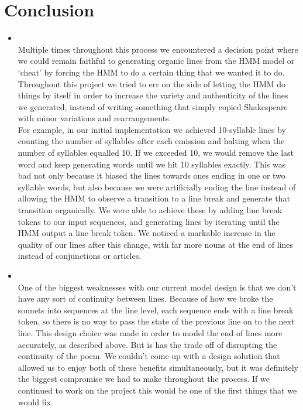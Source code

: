 \section{Conclusion}
\medskip
\begin{itemize}

    \item {} \\

    Multiple times throughout this process we encountered a decision point
    where we could remain faithful to generating organic lines from the HMM
    model or `cheat' by forcing the HMM to do a certain thing that we wanted it
    to do. Throughout this project we tried to err on the side of letting the
    HMM do things by itself in order to increase the variety and authenticity
    of the lines we generated, instead of writing something that simply copied
    Shakespeare with minor variations and rearrangements. \\

    For example, in our initial implementation we achieved 10-syllable lines
    by counting the number of syllables after each emission and halting when
    the number of syllables equalled 10. If we exceeded 10, we would remove
    the last word and keep generating words until we hit 10 syllables exactly.
    This was bad not only because it biased the lines towards ones ending in
    one or two syllable words, but also because we were artificially ending
    the line instead of allowing the HMM to observe a transition to a line break
    and generate that transition organically. We were able to achieve these by
    adding line break tokens to our input sequences, and generating lines by
    iterating until the HMM output a line break token. We noticed a markable
    increase in the quality of our lines after this change, with far more
    nouns at the end of lines instead of conjunctions or articles.


    \item {} \\

    One of the biggest weaknesses with our current model design is that we
    don't have any sort of continuity between lines. Because of how we broke
    the sonnets into sequences at the line level, each sequence ends with a
    line break token, so there is no way to pass the state of the previous
    line on to the next line. This design choice was made in order to model
    the end of lines more accurately, as described above. But is has the trade
    off of disrupting the continuity of the poem. We couldn't come up with a
    design solution that allowed us to enjoy both of these benefits simultaneously,
    but it was definitely the biggest compromise we had to make throughout the
    process. If we continued to work on the project this would be one of the
    first things that we would fix.


\end{itemize}
